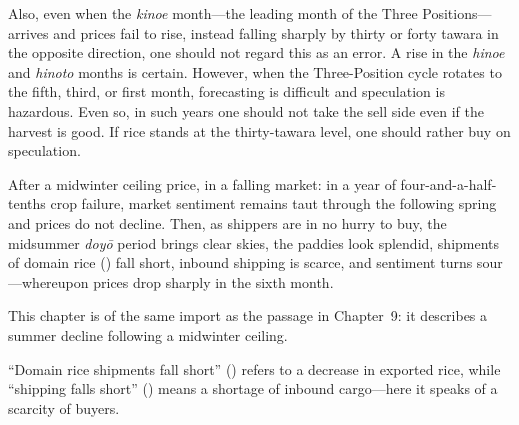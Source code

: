 Also, even when the \textit{kinoe} month---the leading month of the
Three Positions---arrives and prices fail to rise, instead falling
sharply by thirty or forty tawara in the opposite direction, one should
not regard this as an error. A rise in the \textit{hinoe} and
\textit{hinoto} months is certain. However, when the Three-Position
cycle rotates to the fifth, third, or first month, forecasting is
difficult and speculation is hazardous. Even so, in such years one
should not take the sell side even if the harvest is good. If rice stands
at the thirty-tawara level, one should rather buy on speculation.


\begin{sokyubox}
{\small\itshape\color{sokyubar} }

\medskip
After a midwinter ceiling price, in a falling market: in a year of
four-and-a-half-tenths crop failure, market sentiment remains taut
through the following spring and prices do not decline. Then, as
shippers are in no hurry to buy, the midsummer \textit{doy\=o} period
brings clear skies, the paddies look splendid, shipments of domain rice
() fall short, inbound shipping is scarce, and
sentiment turns sour---whereupon prices drop sharply in the sixth month.
\end{sokyubox}

\commentary
This chapter is of the same import as the passage in Chapter~9: it
describes a summer decline following a midwinter ceiling.

``Domain rice shipments fall short'' () refers to a
decrease in exported rice, while ``shipping falls short'' ()
means a shortage of inbound cargo---here it speaks of a scarcity of
buyers.



